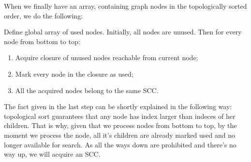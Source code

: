 \documentclass{svproc}
\begin{document}
\begin{definition}

\end{definition}

When we finally have an array, containing graph nodes in the topologically sorted order, we do the following:

Define global array of used nodes. Initially, all nodes are unused.
Then for every node from bottom to top:
\begin{enumerate}
    \item Acquire closure of unused nodes reachable from current node; 
    \item Mark every node in the closure as used;
    \item All the acquired nodes belong to the same SCC.
\end{enumerate}

The fact given in the last step can be shortly explained in the following way:
topological sort guarantees that any node has index larger than indeces of her children.
That is why, given that we process nodes from bottom to top, by the moment we process the node, all it's children are already marked used and no longer available for search.
As all the ways down are prohibited and there's no way up, we will acquire an SCC.
\end{document}
